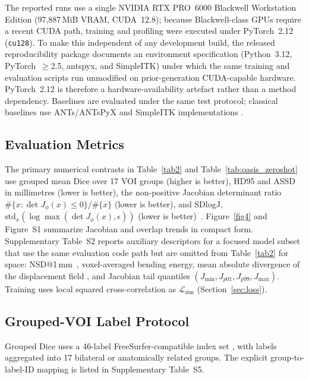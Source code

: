\documentclass[jimaging,article,submit,pdftex,moreauthors]{Definitions/mdpi}
\begin{document}
The reported runs use a single NVIDIA RTX PRO~6000 Blackwell Workstation Edition (97{,}887\,MiB VRAM, CUDA~12.8); because Blackwell-class GPUs require a recent CUDA path, training and profiling were executed under PyTorch~2.12 \cite{paszke2019pytorch} (\texttt{cu128}). To make this independent of any development build, the released reproducibility package documents an environment specification (Python~3.12, PyTorch~\(\geq\)2.5, antspyx, and SimpleITK) under which the same training and evaluation scripts run unmodified on prior-generation CUDA-capable hardware. PyTorch~2.12 is therefore a hardware-availability artefact rather than a method dependency. Baselines are evaluated under the same test protocol; classical baselines use ANTs/ANTsPyX and SimpleITK implementations \cite{avants2008ants,antspyx2024,simpleitk2013}.

\subsection{Evaluation Metrics}
The primary numerical contrasts in Table~\ref{tab2} and Table~\ref{tab:oasis_zeroshot} use grouped mean Dice over 17 VOI groups (higher is better), HD95 and ASSD in millimetres (lower is better), the non-positive Jacobian determinant ratio \(\#\{x:\det J_\phi(x)\le 0\}/\#\{x\}\) (lower is better), and SDlogJ, \(\mathrm{std}_x(\log\max(\det J_\phi(x),\epsilon))\) (lower is better)~\cite{hering2023learn2reg}. Figure~\ref{fig4} and Figure~S1 summarize Jacobian and overlap trends in compact form. Supplementary Table~S2 reports auxiliary descriptors for a focused model subset that use the same evaluation code path but are omitted from Table~\ref{tab2} for space: NSD@1\,mm~\cite{nikolov2021nsd}, voxel-averaged bending energy, mean absolute divergence of the displacement field \cite{bookstein1989tps,mok2020lapirn}, and Jacobian tail quantiles \((J_{\min}, J_{p01}, J_{p99}, J_{\max})\). Training uses local squared cross-correlation as \(\mathcal{L}_{\mathrm{sim}}\) (Section~\ref{sec:loss}).

\subsection{Grouped-VOI Label Protocol}
Grouped Dice uses a 46-label FreeSurfer-compatible index set \cite{fischl2002freesurfer}, with labels aggregated into 17 bilateral or anatomically related groups. The explicit group-to-label-ID mapping is listed in Supplementary Table~S5.
\end{document}
